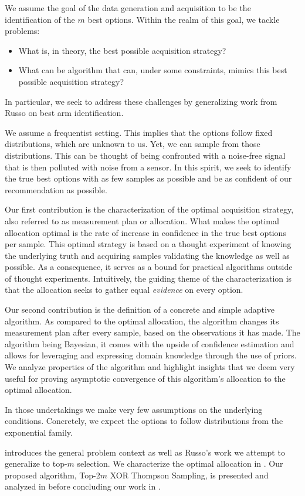 We assume the goal of the data generation and acquisition to be the identification of the $m$ best options. Within the realm of this goal, we tackle problems:
\begin{itemize}
  \item What is, in theory, the best possible acquisition strategy?
  \item What can be algorithm that can, under some constraints, mimics this best possible acquisition strategy?
\end{itemize}
In particular, we seek to address these challenges by generalizing work from Russo \cite{DBLP:journals/corr/Russo16} on best arm identification.

We assume a frequentist setting. This implies that the options follow fixed distributions, which are unknown to us. Yet, we can sample from those distributions. This can be thought of being confronted with a noise-free signal that is then polluted with noise from a sensor. In this spirit, we seek to identify the true best options with as few samples as possible and be as confident of our recommendation as possible.

Our first contribution is the characterization of the optimal acquisition strategy, also referred to as measurement plan or allocation. What makes the optimal allocation optimal is the rate of increase in confidence in the true best options per sample. This optimal strategy is based on a thought experiment of knowing the underlying truth and acquiring samples validating the knowledge as well as possible. As a consequence, it serves as a bound for practical algorithms outside of thought experiments. Intuitively, the guiding theme of the characterization is that the allocation seeks to gather equal \emph{evidence} on every option.

Our second contribution is the definition of a concrete and simple adaptive algorithm. As compared to the optimal allocation, the algorithm changes its measurement plan after every sample, based on the observations it has made. The algorithm being Bayesian, it comes with the upside of confidence estimation and allows for leveraging and expressing domain knowledge through the use of priors. We analyze properties of the algorithm and highlight insights that we deem very useful for proving asymptotic convergence of this algorithm's allocation to the optimal allocation.

In those undertakings we make very few assumptions on the underlying conditions. Concretely, we expect the options to follow distributions from the exponential family.

 introduces the general problem context as well as Russo's work we attempt to generalize to top-$m$ selection. We characterize the optimal allocation in . Our proposed algorithm, Top-2$m$ XOR Thompson Sampling, is presented and analyzed in  before concluding our work in .
